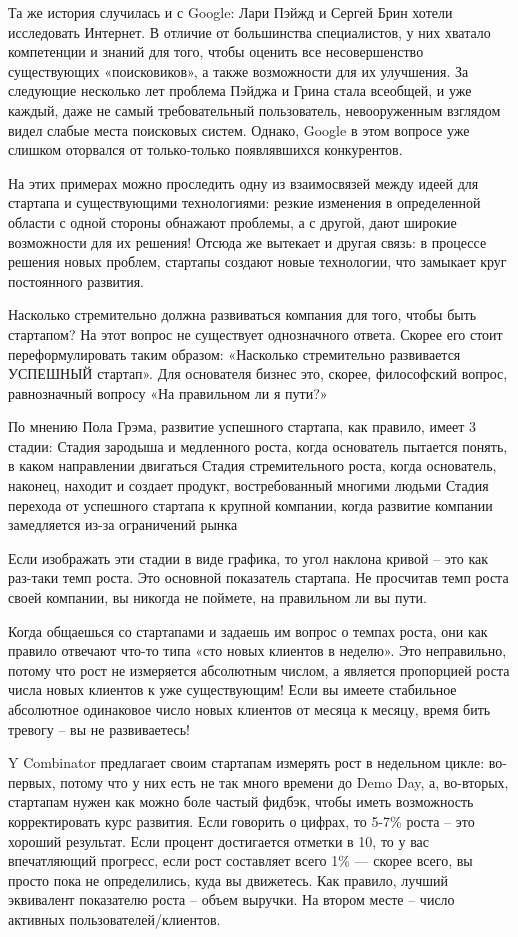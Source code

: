 \documentclass[ebook,12pt,oneside,openany]{memoir}
\begin{document}
Та же история случилась и с Google: Лари Пэйжд и Сергей Брин хотели
исследовать Интернет. В отличие от большинства специалистов, у них
хватало компетенции и знаний для того, чтобы оценить все
несовершенство существующих «поисковиков», а также возможности для их
улучшения. За следующие несколько лет проблема Пэйджа и Грина стала
всеобщей, и уже каждый, даже не самый требовательный пользователь,
невооруженным взглядом видел слабые места поисковых систем. Однако,
Google в этом вопросе уже слишком оторвался от только-только
появлявшихся конкурентов.

На этих примерах можно проследить одну из взаимосвязей между идеей для
стартапа и существующими технологиями: резкие изменения в определенной
области с одной стороны обнажают проблемы, а с другой, дают широкие
возможности для их решения! Отсюда же вытекает и другая связь: в
процессе решения новых проблем, стартапы создают новые технологии, что
замыкает круг постоянного развития.

Насколько стремительно должна развиваться компания для того, чтобы
быть стартапом? На этот вопрос не существует однозначного ответа.
Скорее его стоит переформулировать таким образом: «Насколько
стремительно развивается УСПЕШНЫЙ стартап». Для основателя бизнес это,
скорее, философский вопрос, равнозначный вопросу «На правильном ли я
пути?»

По мнению Пола Грэма, развитие успешного стартапа, как правило, имеет
3 стадии: Стадия зародыша и медленного роста, когда основатель
пытается понять, в каком направлении двигаться Стадия стремительного
роста, когда основатель, наконец, находит и создает продукт,
востребованный многими людьми Стадия перехода от успешного стартапа к
крупной компании, когда развитие компании замедляется из-за
ограничений рынка


Если изображать эти стадии в виде графика, то угол наклона кривой –
это как раз-таки темп роста. Это основной показатель стартапа. Не
просчитав темп роста своей компании, вы никогда не поймете, на
правильном ли вы пути.

Когда общаешься со стартапами и задаешь им вопрос о темпах роста, они
как правило отвечают что-то типа «сто новых клиентов в неделю». Это
неправильно, потому что рост не измеряется абсолютным числом, а
является пропорцией роста числа новых клиентов к уже существующим!
Если вы имеете стабильное абсолютное одинаковое число новых клиентов
от месяца к месяцу, время бить тревогу – вы не развиваетесь!

Y Combinator предлагает своим стартапам измерять рост в недельном
цикле: во-первых, потому что у них есть не так много времени до Demo
Day, а, во-вторых, стартапам нужен как можно боле частый фидбэк, чтобы
иметь возможность корректировать курс развития. Если говорить о
цифрах, то 5-7\% роста – это хороший результат. Если процент
достигается отметки в 10, то у вас впечатляющий прогресс, если рост
составляет всего 1\% — скорее всего, вы просто пока не определились,
куда вы движетесь. Как правило, лучший эквивалент показателю роста –
объем выручки. На втором месте – число активных
пользователей/клиентов.
\end{document}
